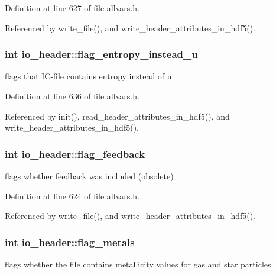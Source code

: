 Definition at line 627 of file allvars.h.



Referenced by write\_\-file(), and write\_\-header\_\-attributes\_\-in\_\-hdf5().

\hypertarget{structio__header_a448788ace72155e22d19af1c01917857}{
\subsubsection[{flag\_\-entropy\_\-instead\_\-u}]{\setlength{\rightskip}{0pt plus 5cm}int {\bf io\_\-header::flag\_\-entropy\_\-instead\_\-u}}}
\label{structio__header_a448788ace72155e22d19af1c01917857}
flags that IC-\/file contains entropy instead of u 

Definition at line 636 of file allvars.h.



Referenced by init(), read\_\-header\_\-attributes\_\-in\_\-hdf5(), and write\_\-header\_\-attributes\_\-in\_\-hdf5().

\hypertarget{structio__header_a98679063cc311c5f6184459600fa05a5}{
\subsubsection[{flag\_\-feedback}]{\setlength{\rightskip}{0pt plus 5cm}int {\bf io\_\-header::flag\_\-feedback}}}
\label{structio__header_a98679063cc311c5f6184459600fa05a5}
flags whether feedback was included (obsolete) 

Definition at line 624 of file allvars.h.



Referenced by write\_\-file(), and write\_\-header\_\-attributes\_\-in\_\-hdf5().

\hypertarget{structio__header_ac025f6c1cff1914d893ce0c7c5fd46bb}{
\subsubsection[{flag\_\-metals}]{\setlength{\rightskip}{0pt plus 5cm}int {\bf io\_\-header::flag\_\-metals}}}
\label{structio__header_ac025f6c1cff1914d893ce0c7c5fd46bb}
flags whether the file contains metallicity values for gas and star particles 

